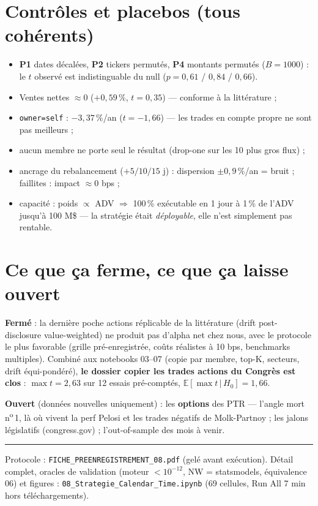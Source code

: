 \documentclass[10pt,a4paper,twocolumn]{article}
\begin{document}
\section{Contrôles et placebos (tous cohérents)}
\begin{itemize}
  \item \textbf{P1} dates décalées, \textbf{P2} tickers permutés, \textbf{P4} montants permutés
  ($B=1000$) : le $t$ observé est indistinguable du null ($p=0{,}61$ / $0{,}84$ / $0{,}66$).
  \item Ventes nettes $\approx0$ ($+0{,}59\,\%$, $t=0{,}35$) --- conforme à la littérature ;
  \item \texttt{owner=self} : $-3{,}37\,\%$/an ($t=-1{,}66$) --- les trades en compte propre ne sont pas meilleurs ;
  \item aucun membre ne porte seul le résultat (drop-one sur les 10 plus gros flux) ;
  \item ancrage du rebalancement ($+5/10/15$ j) : dispersion $\pm0{,}9\,\%$/an = bruit ; faillites : impact $\approx0$ bps ;
  \item capacité : poids $\propto$ ADV $\Rightarrow$ 100\,\% exécutable en 1 jour à 1\,\% de l'ADV jusqu'à 100 M\$ ---
  la stratégie était \emph{déployable}, elle n'est simplement pas rentable.
\end{itemize}

\section{Ce que ça ferme, ce que ça laisse ouvert}
\textbf{Fermé} : la dernière poche \og actions\fg{} réplicable de la littérature (drift post-disclosure
value-weighted) ne produit pas d'alpha net chez nous, avec le protocole le plus favorable
(grille pré-enregistrée, coûts réalistes à 10 bps, benchmarks multiples). Combiné aux notebooks 03--07
(copie par membre, top-K, secteurs, drift équi-pondéré), \textbf{le dossier \og copier les trades actions
du Congrès\fg{} est clos} : $\max t = 2{,}63$ sur 12 essais pré-comptés, $\mathbb{E}[\max t\,|\,H_0]=1{,}66$.
\par\textbf{Ouvert} (données nouvelles uniquement) : les \textbf{options} des PTR --- l'angle mort n\textsuperscript{o}\,1,
là où vivent la perf \og Pelosi\fg{} et les trades négatifs de Molk-Partnoy ; les jalons législatifs
(congress.gov) ; l'out-of-sample des mois à venir.

\vspace{4pt}
\hrule
\vspace{2pt}
{\footnotesize\color{gris} Protocole : \texttt{FICHE\_PREENREGISTREMENT\_08.pdf} (gelé avant exécution).
Détail complet, oracles de validation (moteur $<10^{-12}$, NW = statsmodels, équivalence 06) et figures :
\texttt{08\_Strategie\_Calendar\_Time.ipynb} (69 cellules, Run All 7 min hors téléchargements).}
\end{document}
